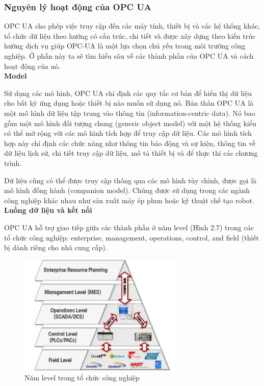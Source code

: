 \subsubsection{Nguyên lý hoạt động của OPC UA}

OPC UA cho phép việc truy cập đến các máy tính, thiết bị và các hệ thống khác, tổ chức dữ liệu theo hướng có cấu trúc, chi tiết và được xây dựng theo kiến trúc hướng dịch vụ giúp OPC-UA là một lựa chọn chủ yếu trong môi trường công nghiệp. Ở phần này ta sẽ tìm hiểu sâu về các thành phần của OPC UA và cách hoạt động của nó.\\

\textbf{Model}

Sử dụng các mô hình, OPC UA chỉ định các quy tắc cơ bản để hiển thị dữ liệu cho bất kỳ ứng dụng hoặc thiết bị nào muốn sử dụng nó. Bản thân OPC UA là một mô hình dữ liệu tập trung vào thông tin (information-centric data). Nó bao gồm một mô hình đối tượng chung (generic object model) với một hệ thống kiểu có thể mở rộng với các mô hình tích hợp để truy cập dữ liệu. Các mô hình tích hợp này chỉ định các chức năng như thông tin báo động và sự kiện, thông tin về dữ liệu lịch sử, chi tiết truy cập dữ liệu, mô tả thiết bị và để thực thi các chương trình.

Dữ liệu cũng có thể được truy cập thông qua các mô hình tùy chỉnh, được gọi là mô hình đồng hành (companion model). Chúng được sử dụng trong các ngành công nghiệp khác nhau như sản xuất máy ép phun hoặc kỹ thuật chế tạo robot.\\

\textbf{Luồng dữ liệu và kết nối}

OPC UA hỗ trợ giao tiếp giữa các thành phần ở năm level (Hình 2.7) trong các tổ chức công nghiệp: enterprise, management, operations, control, and field (thiết bị dành riêng cho nhà cung cấp).

\begin{figure}[!h]
    \centering
    \includegraphics[width=0.7\textwidth]{Images/Basis_knowledge/industrial_levels.jpg}
    \caption{Năm level trong tổ chức công nghiệp \cite{5levw}}
    \label{fig:comp_mqtt}
\end{figure}

